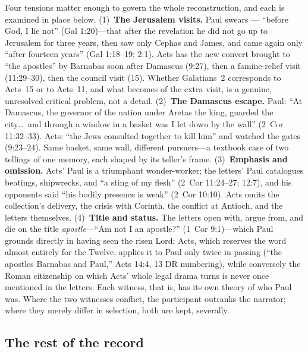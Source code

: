 Four tensions matter enough to govern the whole reconstruction, and each
is examined in place below. (1)~\textbf{The Jerusalem visits.} Paul swears
--- ``before God, I lie not'' (Gal 1:20)---that after the revelation he did
not go up to Jerusalem for three years, then saw only Cephas and James, and
came again only ``after fourteen years'' (Gal 1:18--19; 2:1). Acts has the
new convert brought to ``the apostles'' by Barnabas soon after Damascus
(9:27), then a famine-relief visit (11:29--30), then the council visit
(15). Whether Galatians~2 corresponds to Acts~15 or to Acts~11, and what
becomes of the extra visit, is a genuine, unresolved critical problem, not
a detail. (2)~\textbf{The Damascus escape.} Paul: ``At Damascus, the
governor of the nation under Aretas the king, guarded the city\ldots\ and
through a window in a basket was I let down by the wall'' (2~Cor
11:32--33). Acts: ``the Jews consulted together to kill him'' and watched
the gates (9:23--24). Same basket, same wall, different pursuers---a
textbook case of two tellings of one memory, each shaped by its teller's
frame. (3)~\textbf{Emphasis and omission.} Acts' Paul is a triumphant
wonder-worker; the letters' Paul catalogues beatings, shipwrecks, and ``a
sting of my flesh'' (2~Cor 11:24--27; 12:7), and his opponents said ``his
bodily presence is weak'' (2~Cor 10:10). Acts omits the collection's
delivery, the crisis with Corinth, the conflict at Antioch, and the letters
themselves. (4)~\textbf{Title and status.} The letters open with, argue
from, and die on the title \emph{apostle}---``Am not I an apostle?''
(1~Cor 9:1)---which Paul grounds directly in having seen the risen Lord;
Acts, which reserves the word almost entirely for the Twelve, applies it
to Paul only twice in passing (``the apostles Barnabas and Paul,'' Acts
14:4, 13 DR numbering), while conversely the Roman citizenship on which
Acts' whole legal drama turns is never once mentioned in the letters.
Each witness, that is, has its own theory of who Paul was. Where the two
witnesses conflict, the participant outranks the
narrator; where they merely differ in selection, both are kept, severally.

\subsection{The rest of the record}

